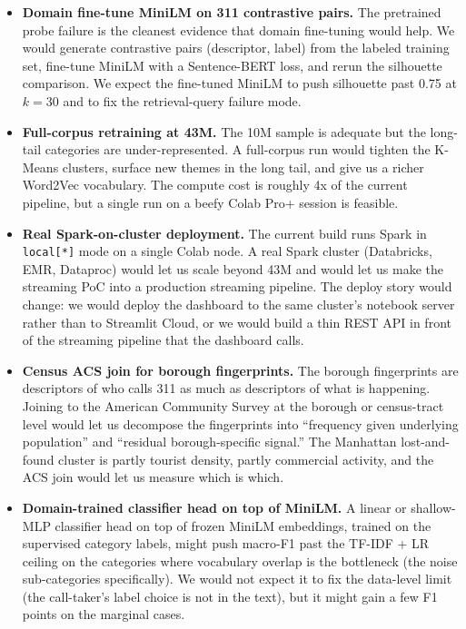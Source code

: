 \documentclass[11pt,letterpaper]{book}
\begin{document}
\begin{itemize}
\item \textbf{Domain fine-tune MiniLM on 311 contrastive pairs.} The pretrained probe failure is the cleanest evidence that domain fine-tuning would help. We would generate contrastive pairs (descriptor, label) from the labeled training set, fine-tune MiniLM with a Sentence-BERT loss, and rerun the silhouette comparison. We expect the fine-tuned MiniLM to push silhouette past 0.75 at $k = 30$ and to fix the retrieval-query failure mode.

\item \textbf{Full-corpus retraining at 43M.} The 10M sample is adequate but the long-tail categories are under-represented. A full-corpus run would tighten the K-Means clusters, surface new themes in the long tail, and give us a richer Word2Vec vocabulary. The compute cost is roughly 4x of the current pipeline, but a single run on a beefy Colab Pro+ session is feasible.

\item \textbf{Real Spark-on-cluster deployment.} The current build runs Spark in \texttt{local[*]} mode on a single Colab node. A real Spark cluster (Databricks, EMR, Dataproc) would let us scale beyond 43M and would let us make the streaming PoC into a production streaming pipeline. The deploy story would change: we would deploy the dashboard to the same cluster's notebook server rather than to Streamlit Cloud, or we would build a thin REST API in front of the streaming pipeline that the dashboard calls.

\item \textbf{Census ACS join for borough fingerprints.} The borough fingerprints are descriptors of who calls 311 as much as descriptors of what is happening. Joining to the American Community Survey at the borough or census-tract level would let us decompose the fingerprints into ``frequency given underlying population'' and ``residual borough-specific signal.'' The Manhattan lost-and-found cluster is partly tourist density, partly commercial activity, and the ACS join would let us measure which is which.

\item \textbf{Domain-trained classifier head on top of MiniLM.} A linear or shallow-MLP classifier head on top of frozen MiniLM embeddings, trained on the supervised category labels, might push macro-F1 past the TF-IDF + LR ceiling on the categories where vocabulary overlap is the bottleneck (the noise sub-categories specifically). We would not expect it to fix the data-level limit (the call-taker's label choice is not in the text), but it might gain a few F1 points on the marginal cases.


\end{itemize}
\end{document}
